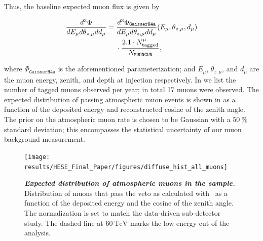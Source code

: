 Thus, the baseline expected muon flux is given by
\begin{linenomath*}
	\begin{equation}
	\begin{split}
	\frac{d^3\Phi}{d E_\mu d \theta_{z,\mu} d d_\mu} ={}& \frac{d^3\Phi_\texttt{GaisserH4a}}{d E_\mu d \theta_{z,\mu} d d_\mu}(E_\mu, \theta_{z,\mu},d_\mu)\\* & \cdot \frac{2.1 \cdot N^\mu_\textmd{tagged}}{N_{\texttt{MUONGUN}}},
	\end{split}
	\label{eq:muon_scaling}
	\end{equation}
\end{linenomath*}
where $\Phi_\texttt{GaisserH4a}$ is the aforementioned parameterization; and $E_\mu$, $\theta_{z,\mu}$, and $d_\mu$ are the muon energy, zenith, and depth at injection respectively.
In  we list the number of tagged muons observed per year; in total 17 muons were observed.
The expected distribution of passing atmospheric muon events is shown in  as a function of the deposited energy and reconstructed cosine of the zenith angle.
The prior on the atmospheric muon rate is chosen to be Gaussian with a $\SI{50}\percent$ standard deviation; this encompasses the statistical uncertainty of our muon background measurement.

\begin{figure}
	\centering
	\texttt{[image: results/HESE\_Final\_Paper/figures/diffuse\_hist\_all\_muons]}
	\caption{\textbf{\textit{Expected distribution of atmospheric muons in the sample.}} Distribution of muons that pass the veto as calculated with \MUONGUN~as a function of the deposited energy and the cosine of the zenith angle.
		The normalization is set to match the data-driven sub-detector study.
		The dashed line at $\SI{60}\TeV$ marks the low energy cut of the analysis.}\label{fig:muons}
\end{figure}

